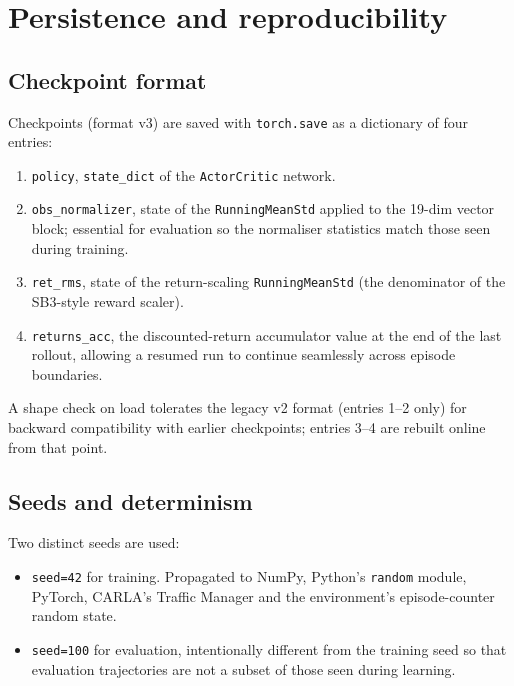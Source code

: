 \section{Persistence and reproducibility}\label{sec:impl-repro}

\subsection{Checkpoint format}\label{sec:impl-checkpoints}

Checkpoints (format v3) are saved with \texttt{torch.save} as a dictionary of four entries:
\begin{enumerate}
  \item \texttt{policy}, \texttt{state\_dict} of the \texttt{ActorCritic} network.
  \item \texttt{obs\_normalizer}, state of the \texttt{RunningMeanStd} applied to the 19-dim
        vector block; essential for evaluation so the normaliser statistics match those seen
        during training.
  \item \texttt{ret\_rms}, state of the return-scaling \texttt{RunningMeanStd} (the denominator
        of the SB3-style reward scaler).
  \item \texttt{returns\_acc}, the discounted-return accumulator value at the end of the last
        rollout, allowing a resumed run to continue seamlessly across episode boundaries.
\end{enumerate}
A shape check on load tolerates the legacy v2 format (entries 1--2 only) for backward
compatibility with earlier checkpoints; entries 3--4 are rebuilt online from that point.

\subsection{Seeds and determinism}\label{sec:impl-seeds}

Two distinct seeds are used:

\begin{itemize}
  \item \texttt{seed=42} for training. Propagated to NumPy, Python's \texttt{random} module,
        PyTorch, CARLA's Traffic Manager and the environment's episode-counter random state.
  \item \texttt{seed=100} for evaluation, intentionally different from the training seed so
        that evaluation trajectories are not a subset of those seen during learning.
\end{itemize}

